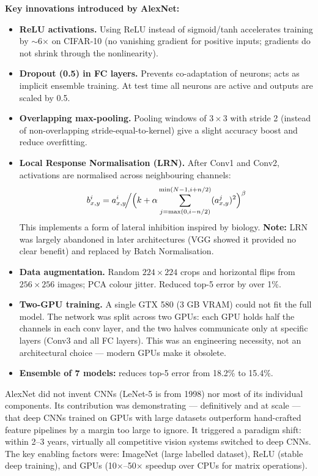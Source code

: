 \documentclass[11pt,a4paper]{article}
\begin{document}
\textbf{Key innovations introduced by AlexNet:}
\begin{itemize}
  \item \textbf{ReLU activations.}  Using ReLU instead of sigmoid/tanh accelerates training by
    $\sim$6$\times$ on CIFAR-10 (no vanishing gradient for positive inputs; gradients do not shrink
    through the nonlinearity).
  \item \textbf{Dropout (0.5) in FC layers.}  Prevents co-adaptation of neurons; acts as implicit
    ensemble training.  At test time all neurons are active and outputs are scaled by 0.5.
  \item \textbf{Overlapping max-pooling.}  Pooling windows of $3\times3$ with stride 2 (instead of
    non-overlapping stride-equal-to-kernel) give a slight accuracy boost and reduce overfitting.
  \item \textbf{Local Response Normalisation (LRN).}  After Conv1 and Conv2, activations are
    normalised across neighbouring channels:
    \[
      b^i_{x,y} = a^i_{x,y} \!\Bigl/ \Bigl(k + \alpha\sum_{j=\max(0,i-n/2)}^{\min(N-1,i+n/2)}
      (a^j_{x,y})^2\Bigr)^\beta
    \]
    This implements a form of lateral inhibition inspired by biology.  \textbf{Note:} LRN was
    largely abandoned in later architectures (VGG showed it provided no clear benefit) and replaced
    by Batch Normalisation.
  \item \textbf{Data augmentation.}  Random $224\times224$ crops and horizontal flips from
    $256\times256$ images; PCA colour jitter.  Reduced top-5 error by over 1\%.
  \item \textbf{Two-GPU training.}  A single GTX 580 (3 GB VRAM) could not fit the full model.
    The network was split across two GPUs: each GPU holds half the channels in each conv layer, and
    the two halves communicate only at specific layers (Conv3 and all FC layers).  This was an
    engineering necessity, not an architectural choice — modern GPUs make it obsolete.
  \item \textbf{Ensemble of 7 models:} reduces top-5 error from 18.2\% to 15.4\%.
\end{itemize}

\begin{insightbox}
AlexNet did not invent CNNs (LeNet-5 is from 1998) nor most of its individual components.
Its contribution was demonstrating — definitively and at scale — that deep CNNs trained on GPUs
with large datasets outperform hand-crafted feature pipelines by a margin too large to ignore.
It triggered a paradigm shift: within 2--3 years, virtually all competitive vision systems switched
to deep CNNs.  The key enabling factors were: ImageNet (large labelled dataset), ReLU (stable deep
training), and GPUs (10$\times$--50$\times$ speedup over CPUs for matrix operations).
\end{insightbox}
\end{document}

